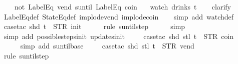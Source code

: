 \begin{isabellebody}
{\ \ \ \ {\isacharparenleft}not\ {\isacharparenleft}LabelEq\ {\isacharprime}{\isacharprime}vend{\isacharprime}{\isacharprime}{\isacharparenright}\ suntil\ LabelEq\ {\isacharprime}{\isacharprime}coin{\isacharprime}{\isacharprime}{\isacharparenright}{\isacharparenright}\isanewline
\ \ \ {\isacharparenleft}watch\ drinks\ t{\isacharparenright}{\isachardoublequoteclose}\isanewline
%
\isadelimproof
\ \ %
\endisadelimproof
%
\isatagproof
{}\isamarkupfalse%
\ clarify\isanewline
\ \ \isamarkupfalse%
\ LabelEq{\isacharunderscore}def\ StateEq{\isacharunderscore}def\ implode{\isacharunderscore}vend\ implode{\isacharunderscore}coin\isanewline
\ \ \isamarkupfalse%
\ {\isacharparenleft}simp\ add{\isacharcolon}\ watch{\isacharunderscore}def{\isacharparenright}\isanewline
\ \ \isamarkupfalse%
\ {\isacharparenleft}case{\isacharunderscore}tac\ {\isachardoublequoteopen}shd\ t\ {\isacharequal}\ {\isacharparenleft}STR\ {\isacharprime}{\isacharprime}init{\isacharprime}{\isacharprime}{\isacharcomma}\ {\isacharbrackleft}{\isacharbrackright}{\isacharparenright}{\isachardoublequoteclose}{\isacharparenright}\isanewline
\ \ \ \isamarkupfalse%
\ {\isacharparenleft}rule\ suntil{\isachardot}step{\isacharparenright}\isanewline
\ \ \ \ \isamarkupfalse%
\ simp\isanewline
\ \ \ \isamarkupfalse%
\ {\isacharparenleft}simp\ add{\isacharcolon}\ possible{\isacharunderscore}steps{\isacharunderscore}init\ updates{\isacharunderscore}init{\isacharparenright}\isanewline
\ \ \ \isamarkupfalse%
\ {\isacharparenleft}case{\isacharunderscore}tac\ {\isachardoublequoteopen}shd\ {\isacharparenleft}stl\ t{\isacharparenright}\ {\isacharequal}\ {\isacharparenleft}STR\ {\isacharprime}{\isacharprime}coin{\isacharprime}{\isacharprime}{\isacharcomma}\ {\isacharbrackleft}{\isacharbrackright}{\isacharparenright}{\isachardoublequoteclose}{\isacharparenright}\isanewline
\ \ \ \ \isamarkupfalse%
\ {\isacharparenleft}simp\ add{\isacharcolon}\ suntil{\isachardot}base{\isacharparenright}\isanewline
\ \ \ \isamarkupfalse%
\ {\isacharparenleft}case{\isacharunderscore}tac\ {\isachardoublequoteopen}shd\ {\isacharparenleft}stl\ t{\isacharparenright}\ {\isacharequal}\ {\isacharparenleft}STR\ {\isacharprime}{\isacharprime}vend{\isacharprime}{\isacharprime}{\isacharcomma}\ {\isacharbrackleft}{\isacharbrackright}{\isacharparenright}{\isachardoublequoteclose}{\isacharparenright}\isanewline
\ \ \ \ \isamarkupfalse%
\ {\isacharparenleft}rule\ suntil{\isachardot}step{\isacharparenright}\isanewline
}
\end{isabellebody}
